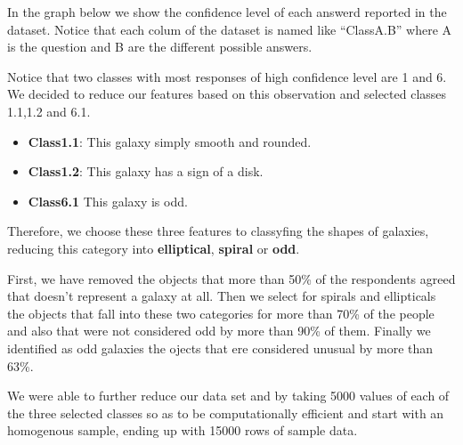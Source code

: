 \documentclass[11pt]{article}
\providecommand{\tightlist}{%
      \setlength{\itemsep}{0pt}\setlength{\parskip}{0pt}}
\begin{document}
In the graph below we show the confidence level of each answerd reported
in the dataset. Notice that each colum of the dataset is named like
``ClassA.B'' where A is the question and B are the different possible
answers.

    Notice that two classes with most responses of high confidence level are
1 and 6. We decided to reduce our features based on this observation and
selected classes 1.1,1.2 and 6.1.

\begin{itemize}
\tightlist
\item
  \textbf{Class1.1}: This galaxy simply smooth and rounded.
\item
  \textbf{Class1.2}: This galaxy has a sign of a disk.
\item
  \textbf{Class6.1} This galaxy is odd.
\end{itemize}

Therefore, we choose these three features to classyfing the shapes of
galaxies, reducing this category into \textbf{elliptical},
\textbf{spiral} or \textbf{odd}.

    First, we have removed the objects that more than 50\% of the
respondents agreed that doesn't represent a galaxy at all. Then we
select for spirals and ellipticals the objects that fall into these two
categories for more than 70\% of the people and also that were not
considered odd by more than 90\% of them. Finally we identified as odd
galaxies the ojects that ere considered unusual by more than 63\%.

We were able to further reduce our data set and by taking 5000 values of
each of the three selected classes so as to be computationally efficient
and start with an homogenous sample, ending up with 15000 rows of sample
data.
\end{document}
